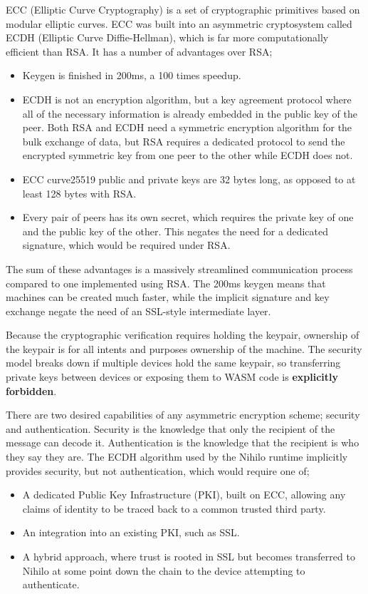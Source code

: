 \documentclass{article}
\begin{document}
ECC \cite{ecc}(Elliptic Curve Cryptography) is a set of cryptographic primitives based on modular elliptic curves. ECC was built into an asymmetric cryptosystem called ECDH (Elliptic Curve Diffie-Hellman), which is far more computationally efficient than RSA. It has a number of advantages over RSA;
\begin{itemize}
\item Keygen is finished in 200ms, a 100 times speedup.
\item ECDH is not an encryption algorithm, but a key agreement protocol where all of the necessary information is already embedded in the public key of the peer. Both RSA and ECDH need a symmetric encryption algorithm for the bulk exchange of data, but RSA requires a dedicated protocol to send the encrypted symmetric key from one peer to the other while ECDH does not.
\item ECC curve25519 public and private keys are 32 bytes long, as opposed to at least 128 bytes with RSA.
\item Every pair of peers has its own secret, which requires the private key of one and the public key of the other. This negates the need for a dedicated signature, which would be required under RSA.
\end{itemize}

The sum of these advantages is a massively streamlined communication process compared to one implemented using RSA. The 200ms keygen means that machines can be created much faster, while the implicit signature and key exchange negate the need of an SSL-style intermediate layer.

Because the cryptographic verification requires holding the keypair, ownership of the keypair is for all intents and purposes ownership of the machine. The security model breaks down if multiple devices hold the same keypair, so transferring private keys between devices or exposing them to WASM code is \textbf{explicitly forbidden}.

There are two desired capabilities of any asymmetric encryption scheme; security and authentication. Security is the knowledge that only the recipient of the message can decode it. Authentication is the knowledge that the recipient is who they say they are. The ECDH algorithm used by the Nihilo runtime implicitly provides security, but not authentication, which would require one of;

\begin{itemize}
\item A dedicated Public Key Infrastructure (PKI), built on ECC, allowing any claims of identity to be traced back to a common trusted third party.
\item An integration into an existing PKI, such as SSL.
\item A hybrid approach, where trust is rooted in SSL but becomes transferred to Nihilo at some point down the chain to the device attempting to authenticate.
\end{itemize}
\end{document}
